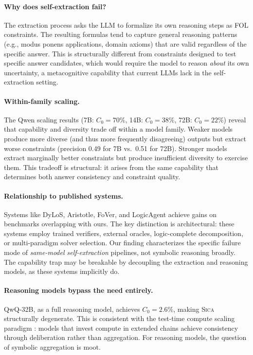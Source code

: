 \documentclass[11pt,a4paper]{article}
\newcommand{\sica}{\textsc{Sica}}
\begin{document}
\paragraph{Why does self-extraction fail?}
The extraction process asks the LLM to formalize its own reasoning steps as FOL constraints.
The resulting formulas tend to capture general reasoning patterns (e.g., modus ponens applications, domain axioms) that are valid regardless of the specific answer.
This is structurally different from constraints designed to test specific answer candidates, which would require the model to reason \emph{about} its own uncertainty, a metacognitive capability that current LLMs lack in the self-extraction setting.

\paragraph{Within-family scaling.}
The Qwen scaling results (7B: $C_0=70\%$, 14B: $C_0=38\%$, 72B: $C_0=22\%$) reveal that capability and diversity trade off within a model family.
Weaker models produce more diverse (and thus more frequently disagreeing) outputs but extract worse constraints (precision 0.49 for 7B vs.\ 0.51 for 72B).
Stronger models extract marginally better constraints but produce insufficient diversity to exercise them.
This tradeoff is structural: it arises from the same capability that determines both answer consistency and constraint quality.

\paragraph{Relationship to published systems.}
Systems like DyLoS, Aristotle, FoVer, and LogicAgent achieve gains on benchmarks overlapping with ours.
The key distinction is architectural: these systems employ trained verifiers, external oracles, logic-complete decomposition, or multi-paradigm solver selection.
Our finding characterizes the specific failure mode of \emph{same-model self-extraction} pipelines, not symbolic reasoning broadly.
The capability trap may be breakable by decoupling the extraction and reasoning models, as these systems implicitly do.

\paragraph{Reasoning models bypass the need entirely.}
QwQ-32B, as a full reasoning model, achieves $C_0=2.6\%$, making \sica{} structurally degenerate.
This is consistent with the test-time compute scaling paradigm \citep{snell2025scaling,deepseekr1}: models that invest compute in extended chains achieve consistency through deliberation rather than aggregation.
For reasoning models, the question of symbolic aggregation is moot.
\end{document}
